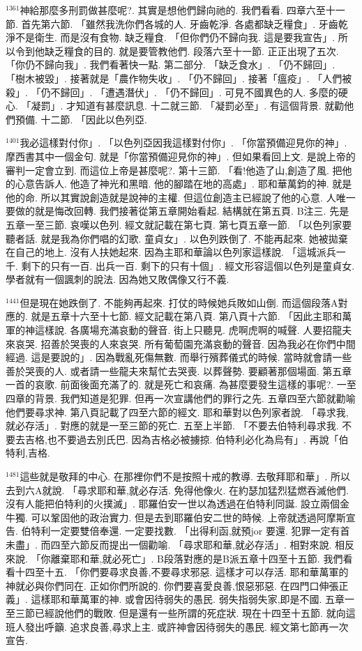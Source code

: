 \documentclass{book}
\begin{document}
$^{1361}$神給那麼多刑罰做甚麼呢?.
其實是想他們歸向祂的.
我們看看.
四章六至十一節.
首先第六節.
「雖然我洗你們各城的人.
牙齒乾淨.
各處都缺乏糧食」.
牙齒乾淨不是衛生.
而是沒有食物.
缺乏糧食.
「但你們仍不歸向我.
這是要我宣告」.
所以令到他缺乏糧食的目的.
就是要管教他們.
段落六至十一節.
正正出現了五次.
「你仍不歸向我」.
我們看著快一點.
第二部分.
「缺乏食水」.
「仍不歸回」.
「樹木被毀」.
接著就是「農作物失收」.
「仍不歸回」.
接著「瘟疫」.
「人們被殺」.
「仍不歸回」.
「遭遇潛伏」.
「仍不歸回」.
可見不國異色的人.
多麼的硬心.
「凝罰」.
才知道有甚麼訊息.
十二就三節.
「凝罰必至」.
有這個背景.
就勸他們預備.
十二節.
「因此以色列亞.

$^{1401}$我必這樣對付你」.
「以色列亞因我這樣對付你」.
「你當預備迎見你的神」.
摩西書其中一個金句.
就是「你當預備迎見你的神」.
但如果看回上文.
是說上帝的審判一定會立到.
而這位上帝是甚麼呢?.
第十三節.
「看!他造了山,創造了風.
把他的心意告訴人.
他造了神光和黑暗.
他的腳踏在地的高處」.
耶和華萬鈞的神.
就是他的命.
所以其實說創造就是說神的主權.
但這位創造主已經說了他的心意.
人唯一要做的就是悔改回轉.
我們接著從第五章開始看起.
結構就在第五頁.
B注三.
先是五章一至三節.
哀嘆以色列.
經文就記載在第七頁.
第七頁五章一節.
「以色列家要聽者話.
就是我為你們唱的幻歌.
童貞女」.
以色列跌倒了.
不能再起來.
她被拋棄在自己的地上.
沒有人扶她起來.
因為主耶和華論以色列家這樣說.
「這城派兵一千.
剩下的只有一百.
出兵一百.
剩下的只有十個」.
經文形容這個以色列是童貞女.
學者就有一個諷刺的說法.
因為她又敗偶像又行不義.

$^{1441}$但是現在她跌倒了.
不能夠再起來.
打仗的時候她兵敗如山倒.
而這個段落A對應的.
就是五章十六至十七節.
經文記載在第八頁.
第八頁十六節.
「因此主耶和萬軍的神這樣說.
各廣場充滿哀動的聲音.
街上只聽見.
虎啊虎啊的喊聲.
人要招龍夫來哀哭.
招善於哭喪的人來哀哭.
所有葡萄園充滿哀動的聲音.
因為我必在你們中間經過.
這是要說的」.
因為戰亂死傷無數.
而舉行殯葬儀式的時候.
當時就會請一些善於哭喪的人.
或者請一些龍夫來幫忙去哭喪.
以葬聲勢.
要顧著那個場面.
第五章一首的哀歌.
前面後面充滿了的.
就是死亡和哀痛.
為甚麼要發生這樣的事呢?.
一至四章的背景.
我們知道是犯罪.
但再一次宣講他們的罪行之先.
五章四至六節就勸喻他們要尋求神.
第八頁記載了四至六節的經文.
耶和華對以色列家者說.
「尋求我,就必存活」.
對應的就是一至三節的死亡.
五至上半節.
「不要去伯特利尋求我.
不要去吉格,也不要過去別氏巴.
因為吉格必被擄掠.
伯特利必化為烏有」.
再說「伯特利,吉格.

$^{1481}$這些就是敬拜的中心.
在那裡你們不是按照十戒的教導.
去敬拜耶和華」.
所以去到六A就說.
「尋求耶和華,就必存活.
免得他像火.
在約瑟加猛烈猛燃吞滅他們.
沒有人能把伯特利的火撲滅」.
耶羅伯安一世以為透過在伯特利同誕.
設立兩個金牛獨.
可以鞏固他的政治實力.
但是去到耶羅伯安二世的時候.
上帝就透過阿摩斯宣告.
伯特利一定要雙倍奉還.
一定要找數.
「出得利函,就預jor 要還.
犯罪一定有首未盡」.
而四至六節反而提出一個勸喻.
「尋求耶和華,就必存活」.
相對來說.
相反來說.
「你離棄耶和華,就必死亡」.
B段落對應的是B派五章十四至十五節.
我們看看十四至十五.
「你們要尋求良善,不要尋求邪惡.
這樣才可以存活.
耶和華萬軍的神就必與你們同在.
正如你們所說的.
你們要喜愛良善,恨惡邪惡.
在四門口伸張正義」.
這樣耶和華萬軍的神.
或會因待弱失的愚民.
弱失指弱失家,即是不國.
五章一至三節已經說他們的戰敗.
但是還有一些所謂的死症狀.
現在十四至十五節.
就向這班人發出呼籲.
追求良善,尋求上主.
或許神會因待弱失的愚民.
經文第七節再一次宣告.
\end{document}
